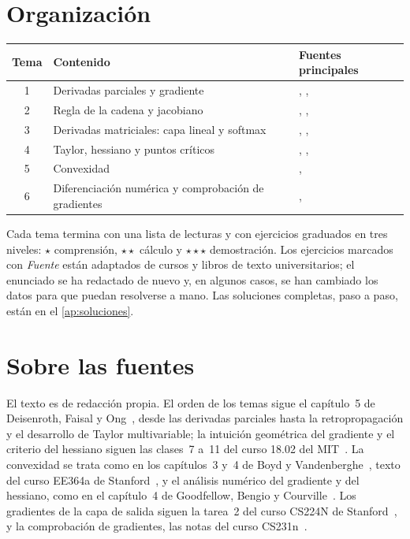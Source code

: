 \documentclass[11pt,a4paper,twoside,openany]{book}
\begin{document}
\section*{Organización}
\begin{center}
\begin{tabular}{@{}cll@{}}
\toprule
Tema & Contenido & Fuentes principales \\
\midrule
1 & Derivadas parciales y gradiente & \cite{mit1802}, \cite{mml}, \cite{d2l} \\
2 & Regla de la cadena y jacobiano & \cite{mml}, \cite{mit1802}, \cite{gbc} \\
3 & Derivadas matriciales: capa lineal y softmax & \cite{mml}, \cite{cs224n}, \cite{cookbook} \\
4 & Taylor, hessiano y puntos críticos & \cite{mml}, \cite{gbc}, \cite{mit1802} \\
5 & Convexidad & \cite{bv}, \cite{ee364a} \\
6 & Diferenciación numérica y comprobación de gradientes & \cite{gbc}, \cite{cs231n} \\
\bottomrule
\end{tabular}
\end{center}

Cada tema termina con una lista de lecturas y con ejercicios graduados en tres niveles: $\star$ comprensión, $\star\star$ cálculo y $\star\star\star$ demostración. Los ejercicios marcados con \emph{Fuente} están adaptados de cursos y libros de texto universitarios; el enunciado se ha redactado de nuevo y, en algunos casos, se han cambiado los datos para que puedan resolverse a mano. Las soluciones completas, paso a paso, están en el \cref{ap:soluciones}.

\section*{Sobre las fuentes}
El texto es de redacción propia. El orden de los temas sigue el capítulo~5 de Deisenroth, Faisal y Ong~\cite{mml}, desde las derivadas parciales hasta la retropropagación y el desarrollo de Taylor multivariable; la intuición geométrica del gradiente y el criterio del hessiano siguen las clases~7 a~11 del curso 18.02 del MIT~\cite{mit1802}. La convexidad se trata como en los capítulos~3 y~4 de Boyd y Vandenberghe~\cite{bv}, texto del curso EE364a de Stanford~\cite{ee364a}, y el análisis numérico del gradiente y del hessiano, como en el capítulo~4 de Goodfellow, Bengio y Courville~\cite{gbc}. Los gradientes de la capa de salida siguen la tarea~2 del curso CS224N de Stanford~\cite{cs224n}, y la comprobación de gradientes, las notas del curso CS231n~\cite{cs231n}.
\end{document}
